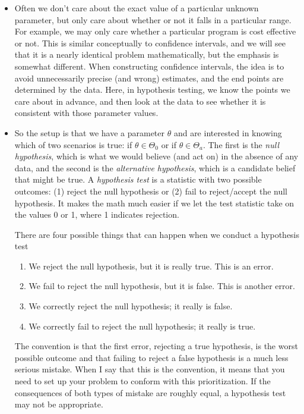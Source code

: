\begin{itemize}[leftmargin=0pt]

\item Often we don't care about the exact value of a particular
  unknown parameter, but only care about whether or not it falls in a
  particular range.  For example, we may only care whether a
  particular program is cost effective or not.  This is similar
  conceptually to confidence intervals, and we will see that it is a
  nearly identical problem mathematically, but the emphasis is
  somewhat different.  When constructing confidence intervals, the
  idea is to avoid unnecessarily precise (and wrong) estimates, and
  the end points are determined by the data.  Here, in hypothesis
  testing, we know the points we care about in advance, and then look
  at the data to see whether it is consistent with those parameter
  values.

\item So the setup is that we have a parameter $\theta$ and are interested
  in knowing which of two scenarios is true: if $\theta \in \Theta_0$ or if $\theta \in
  \Theta_a$.  The first is the \emph{null hypothesis}, which is what we
  would believe (and act on) in the absence of any data, and the
  second is the \emph{alternative hypothesis}, which is a candidate
  belief that might be true.  A \emph{hypothesis test} is a statistic
  with two possible outcomes: (1) reject the null hypothesis or (2)
  fail to reject/accept the null hypothesis.  It makes the math much
  easier if we let the test statistic take on the values 0 or 1, where
  1 indicates rejection.

  There are four possible things that can happen when we conduct a
  hypothesis test
  \begin{enumerate}
  \item We reject the null hypothesis, but it is really true.  This is
    an error.
  \item We fail to reject the null hypothesis, but it is false.  This
    is another error.
  \item We correctly reject the null hypothesis; it really is false.
  \item We correctly fail to reject the null hypothesis; it really is true.
  \end{enumerate}
  The convention is that the first error, rejecting a true hypothesis,
  is the worst possible outcome and that failing to reject a false
  hypothesis is a much less serious mistake.  When I say that this is
  the convention, it means that you need to set up your problem to
  conform with this prioritization.  If the consequences of both types
  of mistake are roughly equal, a hypothesis test may not be
  appropriate.


\end{itemize}
